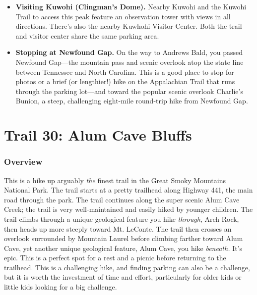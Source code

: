 \documentclass[
  letterpaper,
  DIV=11,
  numbers=noendperiod]{scrreprt}
\providecommand{\tightlist}{%
  \setlength{\itemsep}{0pt}\setlength{\parskip}{0pt}}\usepackage{longtable,booktabs,array}
\begin{document}
\begin{itemize}
\tightlist
\item
  \textbf{Visiting Kuwohi (Clingman's Dome).} Nearby Kuwohi and the
  Kuwohi Trail to access this peak feature an observation tower with
  views in all directions. There's also the nearby Kuwhohi Visitor
  Center. Both the trail and visitor center share the same parking area.
\item
  \textbf{Stopping at Newfound Gap.} On the way to Andrews Bald, you
  passed Newfound Gap---the mountain pass and scenic overlook atop the
  state line between Tennessee and North Carolina. This is a good place
  to stop for photos or a brief (or lengthier!) hike on the Appalachian
  Trail that runs through the parking lot---and toward the popular
  scenic overlook Charlie's Bunion, a steep, challenging eight-mile
  round-trip hike from Newfound Gap.
\end{itemize}

\chapter{Trail 30: Alum Cave Bluffs}\label{trail-30-alum-cave-bluffs}

\subsection{Overview}\label{overview-30}

This is a hike up arguably \emph{the} finest trail in the Great Smoky
Mountains National Park. The trail starts at a pretty trailhead along
Highway 441, the main road through the park. The trail continues along
the super scenic Alum Cave Creek; the trail is very well-maintained and
easily hiked by younger children. The trail climbs through a unique
geological feature you hike \emph{through}, Arch Rock, then heads up
more steeply toward Mt. LeConte. The trail then crosses an overlook
surrounded by Mountain Laurel before climbing farther toward Alum Cave,
yet another unique geological feature, Alum Cave, you hike
\emph{beneath.} It's epic. This is a perfect spot for a rest and a
picnic before returning to the trailhead. This is a challenging hike,
and finding parking can also be a challenge, but it is worth the
investment of time and effort, particularly for older kids or little
kids looking for a big challenge.
\end{document}
